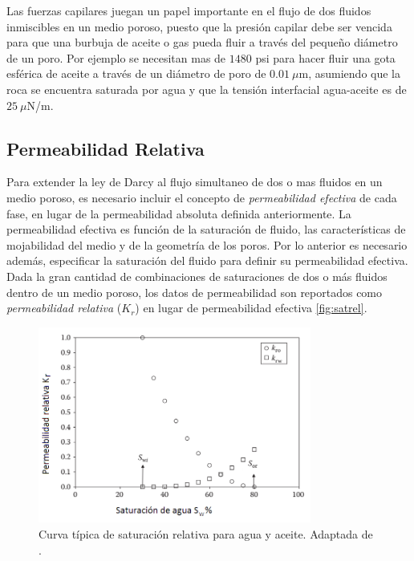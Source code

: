 Las fuerzas capilares juegan un papel importante en el flujo de dos fluidos inmiscibles en un medio poroso, puesto que la presión capilar debe ser vencida para que una burbuja de aceite o gas pueda fluir a través del pequeño diámetro de un poro. Por ejemplo se necesitan mas de $1480$ psi para hacer fluir una gota esférica de aceite a través de un diámetro de poro de $0.01~\mu$m, asumiendo que la roca se encuentra saturada por agua y que la tensión interfacial agua-aceite es de $25~\mu$N/m.


\subsection{Permeabilidad Relativa}%

Para extender la ley de Darcy al flujo simultaneo de dos o mas fluidos en un medio poroso, es necesario incluir el concepto de \emph{permeabilidad efectiva} de cada fase, en lugar de la permeabilidad absoluta definida anteriormente. La permeabilidad efectiva es función de la saturación de fluido, las características de mojabilidad del medio y de la geometría de los poros. Por lo anterior es necesario además, especificar la saturación del fluido para definir su permeabilidad efectiva. Dada la gran cantidad de combinaciones de saturaciones de dos o más fluidos dentro de un medio poroso, los datos de permeabilidad son reportados como \emph{permeabilidad relativa} ($K_{r}$) en lugar de permeabilidad efectiva \autoref{fig:satrel}.

\begin{figure}
    \centering
    \includegraphics[width=0.8\textwidth]{Graphics/satrel.png}
    \caption[Saturación relativa]{Curva típica de saturación relativa para agua y aceite. Adaptada de \cite{Dandekar}.}
    \label{fig:satrel}
\end{figure}

